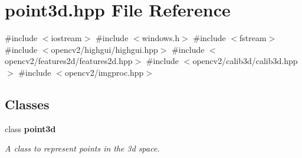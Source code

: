 \section{point3d.\+hpp File Reference}
\label{point3d_8hpp}
{\ttfamily \#include $<$iostream$>$}\newline
{\ttfamily \#include $<$windows.\+h$>$}\newline
{\ttfamily \#include $<$fstream$>$}\newline
{\ttfamily \#include $<$opencv2/highgui/highgui.\+hpp$>$}\newline
{\ttfamily \#include $<$opencv2/features2d/features2d.\+hpp$>$}\newline
{\ttfamily \#include $<$opencv2/calib3d/calib3d.\+hpp$>$}\newline
{\ttfamily \#include $<$opencv2/imgproc.\+hpp$>$}\newline
\subsection*{Classes}
\begin{DoxyCompactItemize}
\item 
class \textbf{ point3d}
\begin{DoxyCompactList}\small\item\em A class to represent points in the 3d space. \end{DoxyCompactList}\end{DoxyCompactItemize}
